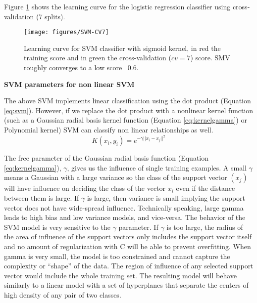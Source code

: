 \documentclass[11pt]{article}
\theoremstyle{definition}
\theoremstyle{remark}
\begin{document}
{Figure \ref{fig:svm-cv7} shows the learning curve for the logistic regression classifier using cross-validation (7 splits).
\begin{figure}[H]
        \centering
        \texttt{[image: figures/SVM-CV7]}
        \caption{Learning curve for SVM classifier with sigmoid kernel, in red the training score and in green the cross-validation ($cv=7$) score. SMV roughly converges to a low score ~0.6.
        } \label{fig:svm-cv7}
\end{figure}

\textbf{SVM parameters for non linear SVM}

The above SVM implements linear classification using the dot product (Equation \ref{eq:svm}). However, if we replace the dot product with a nonlinear kernel function (such as a Gaussian radial basis kernel function (Equation \ref{eq:kernelgamma}) or Polynomial kernel) SVM can classify non linear relationships as well.
\begin{equation} \label{eq:kernelgamma}
K(x_i,y_i) = e^{-\gamma ||x_i-x_j||^2}
\end{equation}

The free parameter of the Gaussian radial basis function (Equation \ref{eq:kernelgamma}), $\gamma$, gives us the influence of  single training examples. 
A small  $\gamma$ means a Gaussian with a large variance so the class of the support vector $(x_j)$ will have influence on deciding the class of the vector $x_i$ even if the distance between them is large. If  $\gamma$ is large, then variance is small implying the support vector does not have wide-spread influence. Technically speaking, large gamma leads to high bias and low variance models, and vice-versa.
The behavior of the SVM model is very sensitive to the $\gamma$ parameter. If $\gamma$ is too large, the radius of the area of influence of the support vectors only includes the support vector itself and no amount of regularization with C will be able to prevent overfitting.
When gamma is very small, the model is too constrained and cannot capture the complexity or “shape” of the data. The region of influence of any selected support vector would include the whole training set. The resulting model will behave similarly to a linear model with a set of hyperplanes that separate the centers of high density of any pair of two classes.


}
\end{document}
